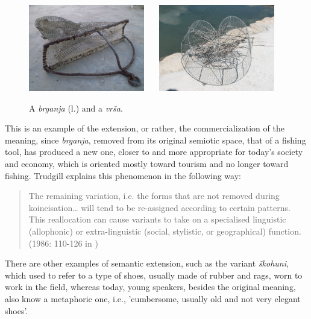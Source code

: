 \documentclass[output=paper]{LSP/langsci}
\begin{document}
\begin{figure}
\includegraphics[width=0.45\textwidth]{illustrations/skevin_fig4_brganja}~~~
\includegraphics[width=0.45\textwidth]{illustrations/skevin_fig4_vrsa}
\label{fig4_brganja_vrsa}
\caption{A \textit{brganja} (l.) and a \textit{vrša}.}
\end{figure}

This is an example of the extension, or rather, the commercialization of the meaning, since \textit{brganja}, removed from its original semiotic space, that of a fishing tool, has produced a new one, closer to and more appropriate for today’s society and economy, which is oriented mostly toward tourism and no longer toward fishing. Trudgill  explains this phenomenon in the following way: 

\begin{quote}
The remaining variation, i.e. the forms that are not removed during koineisation… will tend to be re-assigned according to certain patterns. This reallocation can cause variants to take on a specialised linguistic (allophonic) or extra-linguistic (social, stylistic, or geographical) function. (1986: 110-126 in \citealt[46]{auer_study_2004})
\end{quote}

There are other examples of semantic extension, such as the variant \textit{škohuni}, which used to refer to a type of shoes, usually made of rubber and rags, worn to work in the field, whereas today, young speakers, besides the original meaning, also know a metaphoric one, i.e., 'cumbersome, usually old and not very elegant shoes'.
\end{document}
